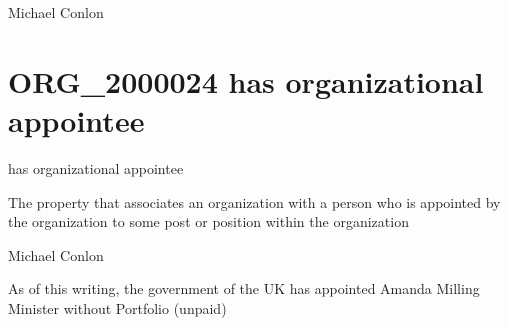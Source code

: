 \documentclass[letterpaper,10pt,english]{sphinxmanual}
\begin{document}
\begin{sphinxShadowBox}

\sphinxAtStartPar
Michael Conlon 
\end{sphinxShadowBox}
\begin{quote}
\label{\detokenize{doc-ORG_2000024:org-2000024}}\label{\detokenize{doc-ORG_2000024:has-organizational-appointee}}\label{\detokenize{doc-ORG_2000024:org-2000024}}
\ignorespaces \end{quote}


\section{ORG\_2000024 \sphinxhyphen{} has organizational appointee}
\label{\detokenize{doc-ORG_2000024:org-2000024-has-organizational-appointee}}\label{\detokenize{doc-ORG_2000024:index-0}}\label{\detokenize{doc-ORG_2000024::doc}}
\begin{sphinxShadowBox}

\sphinxAtStartPar
has organizational appointee
\end{sphinxShadowBox}

\begin{sphinxShadowBox}

\sphinxAtStartPar
The property that associates an organization with a person who is appointed by the organization to some post or position within the organization
\end{sphinxShadowBox}

\begin{sphinxShadowBox}

\sphinxAtStartPar
Michael Conlon 
\end{sphinxShadowBox}

\begin{sphinxShadowBox}

\sphinxAtStartPar
As of this writing, the government of the UK has appointed Amanda Milling Minister without Portfolio (unpaid)
\end{sphinxShadowBox}
\end{document}
